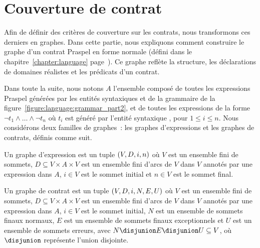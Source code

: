\section{Couverture de contrat}
\label{section:test:contract}

Afin de définir des critères de couverture sur les contrats, nous transformons
ces derniers en graphes. Dans cette partie, nous expliquons comment construire
le graphe d'un contrat Praspel en forme normale (défini dans le
chapitre~\ref{chapter:language} page~\pageref{chapter:language}). Ce graphe
reflète la structure, les déclarations de domaines réalistes et les prédicats
d'un contrat.

Dans toute la suite, nous notons $A$ l'ensemble composé de toutes les
expressions Praspel générées par les entités syntaxiques  et
 de la grammaire de la
figure~\ref{figure:language:grammar_part2}, et de toutes les expressions de la
forme $\neg t_1 \land \dots \land \neg t_n$ où $t_i$ est généré par l'entité
syntaxique , pour $1 \leq i \leq n$. Nous considérons deux
familles de graphes~: les {\strong graphes d'expressions} et les {\strong
graphes de contrats}, définis comme suit.

\begin{definition}

Un {\strong graphe d'expression} est un tuple $(V, D, i,\-n)$ où $V$ est un
ensemble fini de {\strong sommets}, $D \subseteq V \times A \times V$ est un
ensemble fini d'{\strong arcs} de $V$ dans $V$ annotés par une {\strong
expression} dans $A$, $i \in V$ est le {\strong sommet initial} et $n \in V$ est
le {\strong sommet final}.

\end{definition}

\begin{definition}

Un {\strong graphe de contrat} est un tuple $(V, D, i, N, E,\-U)$ où $V$ est un
ensemble fini de {\strong sommets}, $D \subseteq V \times A \times V$ est un
ensemble fini d'{\strong arcs} de $V$ dans $V$ annotés par une expression dans
$A$, $i \in V$ est le {\strong sommet initial}, $N$ est un ensemble de {\strong
sommets finaux normaux}, $E$ est un ensemble de {\strong sommets finaux
exceptionnels} et $U$ est un ensemble de {\strong sommets erreurs}, avec $N
\disjunion E \disjunion U \subseteq V$, où $\disjunion$ représente l'union
disjointe.

\end{definition}

